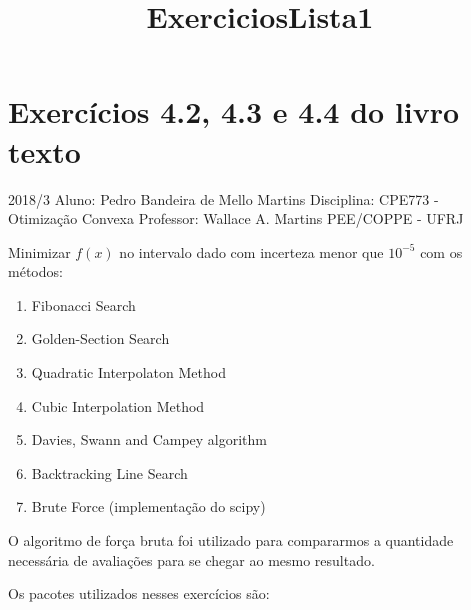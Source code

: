 \documentclass[11pt]{article}
\title{ExerciciosLista1}
\providecommand{\tightlist}{%
      \setlength{\itemsep}{0pt}\setlength{\parskip}{0pt}}
\begin{document}
    
    
    \maketitle
    
    

    
    \hypertarget{exercuxedcios-4.2-4.3-e-4.4-do-livro-texto}{%
\section{Exercícios 4.2, 4.3 e 4.4 do livro
texto}\label{exercuxedcios-4.2-4.3-e-4.4-do-livro-texto}}

    2018/3 Aluno: Pedro Bandeira de Mello Martins Disciplina: CPE773 -
Otimização Convexa Professor: Wallace A. Martins PEE/COPPE - UFRJ

    Minimizar \(f(x)\) no intervalo dado com incerteza menor que \(10^{-5}\)
com os métodos:

\begin{enumerate}
\def\labelenumi{\arabic{enumi}.}
\tightlist
\item
  Fibonacci Search
\item
  Golden-Section Search
\item
  Quadratic Interpolaton Method
\item
  Cubic Interpolation Method
\item
  Davies, Swann and Campey algorithm
\item
  Backtracking Line Search
\item
  Brute Force (implementação do scipy)
\end{enumerate}

O algoritmo de força bruta foi utilizado para compararmos a quantidade
necessária de avaliações para se chegar ao mesmo resultado.

    Os pacotes utilizados nesses exercícios são:
\end{document}
